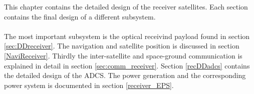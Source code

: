 This chapter contains the detailed design of the receiver satellites. Each section contains the final design of a different subsystem. 
\\\\
The most important subsystem is the optical receivind payload found in section \ref{sec:DDreceiver}. The navigation and satellite position is discussed in section \ref{NaviReceiver}. Thirdly the inter-satellite and space-ground communication is explained in detail in section \ref{sec:comm_receiver}. Section \ref{recDDadcs} contains the detailed design of the \ac{ADCS}. The power generation and the corresponding power system is documented in section \ref{receiver_EPS}. 